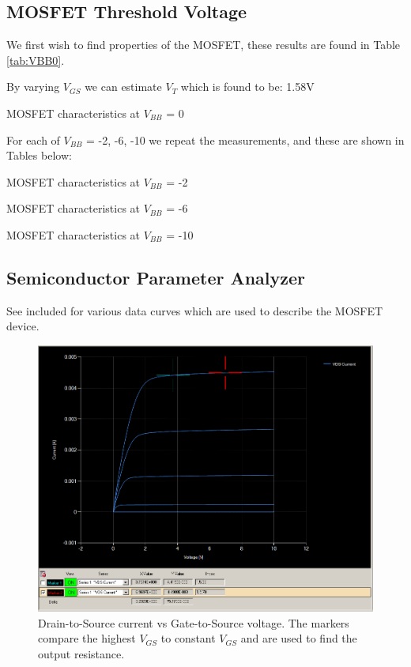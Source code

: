 \subsection{MOSFET Threshold Voltage}

We first wish to find properties of the MOSFET, these results are found in Table \ref{tab:VBB0}.

By varying $V_{GS}$ we can estimate $V_T$ which is found to be: 1.58V

\begin{table}[h]
    
    \caption{MOSFET characteristics at $V_{BB}$ = 0}
    \label{tab:VBB0}
\end{table}

For each of $V_{BB}$ = -2, -6, -10 we repeat the measurements, and these are shown in Tables below:

\begin{table}[ht]
    
    \caption{MOSFET characteristics at $V_{BB}$ = -2}
    \label{tab:VBB2}
\end{table}

\begin{table}[ht]
    
    \caption{MOSFET characteristics at $V_{BB}$ = -6}
    \label{tab:VBB6}
\end{table}

\begin{table}[ht]
    
    \caption{MOSFET characteristics at $V_{BB}$ = -10}
    \label{tab:VBB10}
\end{table}

\subsection{Semiconductor Parameter Analyzer}

See included for various data curves which are used to describe the MOSFET device.

\begin{figure}[ht]
    \centering
    \includegraphics[width=.95\linewidth]{figures/Graph_For_Output_Resitance.PNG}
    \caption{Drain-to-Source current vs Gate-to-Source voltage. The markers compare the highest $V_{GS}$ to constant $V_{GS}$ and are used to find the output resistance.}
    \label{fig:VGS_varied}
\end{figure}

